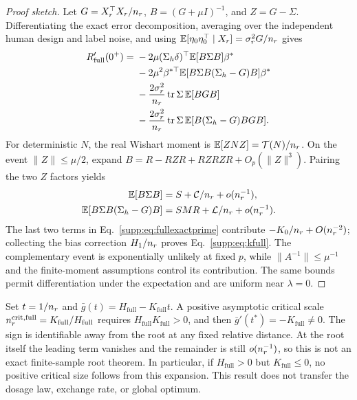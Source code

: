 \begin{proof}[Proof sketch]
Let $G=X_r^\top X_r/n_r$, $B=(G+\mu I)^{-1}$, and $Z=G-\Sigma$. Differentiating the exact error decomposition, averaging over the independent human design and label noise, and using $\mathbb E[\eta_0\eta_0^\top\mid X_r]=\sigma_r^2G/n_r$ gives
\begin{align}
  R_{\mathrm{full}}'(0^+)={}&-2\mu(\Sigma_h\delta)^\top\mathbb E[B\Sigma B]\beta^*\notag\\
  &-2\mu^2\beta^{*\top}\mathbb E[B\Sigma B(\Sigma_h-G)B]\beta^*\notag\\
  &-\frac{2\sigma_r^2}{n_r}\operatorname{tr}\Sigma\,\mathbb E[BGB]\notag\\
  &-\frac{2\sigma_r^2}{n_r}\operatorname{tr}\Sigma\,\mathbb E[B(\Sigma_h-G)BGB].
  \label{supp:eq:fullexactprime}
\end{align}
For deterministic $N$, the real Wishart moment is
$\mathbb E[ZNZ]=\mathcal T(N)/n_r$. On the event $\|Z\|\le\mu/2$, expand
$B=R-RZR+RZRZR+O_p(\|Z\|^3)$.
Pairing the two $Z$ factors yields
\begin{align}
  \mathbb E[B\Sigma B]&=S+\mathcal C/n_r+o(n_r^{-1}),\notag\\
  \mathbb E[B\Sigma B(\Sigma_h-G)B]&=SMR+\mathcal L/n_r+o(n_r^{-1}).
\end{align}
The last two terms in Eq.~\eqref{supp:eq:fullexactprime} contribute $-K_0/n_r+O(n_r^{-2})$; collecting the bias correction $H_1/n_r$ proves Eq.~\eqref{supp:eq:kfull}. The complementary event is exponentially unlikely at fixed $p$, while $\|A^{-1}\|\le\mu^{-1}$ and the finite-moment assumptions control its contribution. The same bounds permit differentiation under the expectation and are uniform near $\lambda=0$.
\end{proof}

\begin{remark}
Set $t=1/n_r$ and $\bar g(t)=H_{\mathrm{full}}-K_{\mathrm{full}}t$. A positive asymptotic critical scale
$n_r^{\mathrm{crit,full}}=K_{\mathrm{full}}/H_{\mathrm{full}}$
requires $H_{\mathrm{full}}K_{\mathrm{full}}>0$, and then $\bar g'(t^*)=-K_{\mathrm{full}}\ne0$. The sign is identifiable away from the root at any fixed relative distance. At the root itself the leading term vanishes and the remainder is still $o(n_r^{-1})$, so this is not an exact finite-sample root theorem. In particular, if $H_{\mathrm{full}}>0$ but $K_{\mathrm{full}}\le0$, no positive critical size follows from this expansion. This result does not transfer the dosage law, exchange rate, or global optimum.
\end{remark}

